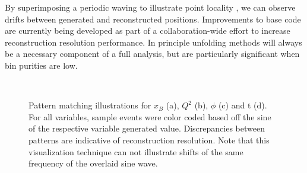     By superimposing a periodic waving to illustrate point locality , we can observe drifts between generated and reconstructed positions. Improvements to base code are currently being developed as part of a collaboration-wide effort to increase reconstruction resolution performance. In principle unfolding methods will always be a necessary component of a full analysis, but are particularly significant when bin purities are low. 
    
    \begin{figure}[H]
        \centering
        \hfill
        \\
        \hfill
        \caption[Truth vs. Observed Binning Variable Samples]{Pattern matching illustrations for $x_B$ (a), $Q^2$ (b), $\phi$ (c) and t (d). For all variables, sample events were color coded based off the sine of the respective variable generated value. Discrepancies between patterns are indicative of reconstruction resolution. Note that this visualization technique can not illustrate shifts of the same frequency of the overlaid sine wave.}
        \label{fig:bin_waving}
    \end{figure}
